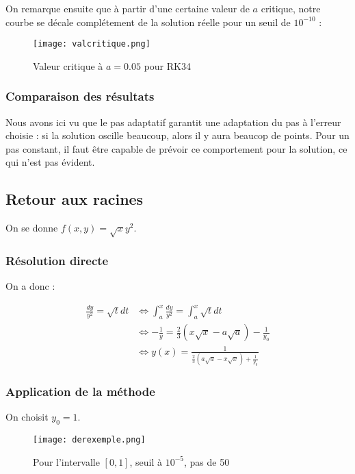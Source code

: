 \documentclass[a4paper, titlepage]{livret} %
\begin{document}
					On remarque ensuite que à partir d'une certaine valeur de $a$ critique, notre courbe se décale complétement de la solution réelle pour un seuil de $10^{-10}$ :
					
					\begin{figure}[!h]
						\centering
  							\texttt{[image: valcritique.png]}
  							\caption{Valeur critique à $a = 0.05$ pour RK34}
					\end{figure}
					\newpage

				\subsubsection{Comparaison des résultats}
					Nous avons ici vu que le pas adaptatif garantit une adaptation du pas à l'erreur choisie : si la solution oscille beaucoup, alors il y aura beaucop de points.
					Pour un pas constant, il faut être capable de prévoir ce comportement pour la solution, ce qui n'est pas évident.

			\subsection{Retour aux racines}
				On se donne $f(x,y) = \sqrt{x}y^{2}$.

				\subsubsection{Résolution directe}
					On a donc :

					\[\begin{aligned}
						\frac{dy}{y^{2}} = \sqrt{t}dt
						& \Leftrightarrow \int_{a}^{x} \frac{dy}{y^{2}} =\int_{a}^{x} \sqrt{t}dt \\
						& \Leftrightarrow -\frac{1}{y} = \frac{2}{3}(x\sqrt{x} - a\sqrt{a}) - \frac{1}{y_{0}}\\
						& \Leftrightarrow y(x)=\frac{1}{\frac{2}{3}(a\sqrt{a} - x\sqrt{x}) + \frac{1}{y_{0}}}
					\end{aligned}\]

				\subsubsection{Application de la méthode}
					On choisit $y_0 = 1$.

					\begin{figure}[!h]
						\centering
  							\texttt{[image: derexemple.png]}
  							\caption{Pour l'intervalle $[0,1]$, seuil à $10^{-5}$, pas de 50}
					\end{figure}
					\newpage
					
\end{document}
